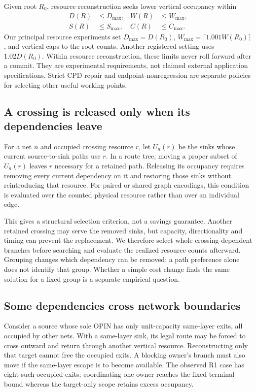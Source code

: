 \documentclass[conference,10pt]{IEEEtran}
\begin{document}
Given root $R_0$, resource reconstruction seeks lower vertical occupancy within
\begin{equation}
 \begin{aligned}
 D(R)&\le D_{\max}, & W(R)&\le W_{\max},\\
 S(R)&\le S_{\max}, & C(R)&\le C_{\max}.
 \end{aligned}
\label{eq:budget}
\end{equation}
Our principal resource experiments set $D_{\max}=D(R_0)$, $W_{\max}=\lceil1.001W(R_0)\rceil$, and vertical caps to the root counts. Another registered setting uses $1.02D(R_0)$. Within resource reconstruction, these limits never roll forward after a commit. They are experimental requirements, not claimed external application specifications. Strict CPD repair and endpoint-nonregression are separate policies for selecting other useful working points.

\subsection{A crossing is released only when its dependencies leave}
For a net $n$ and occupied crossing resource $r$, let $U_n(r)$ be the sinks whose current source-to-sink paths use $r$. In a route tree, moving a proper subset of $U_n(r)$ leaves $r$ necessary for a retained path. Releasing its occupancy requires removing every current dependency on it and restoring those sinks without reintroducing that resource. For paired or shared graph encodings, this condition is evaluated over the counted physical resource rather than over an individual edge.

This gives a structural selection criterion, not a savings guarantee. Another retained crossing may serve the removed sinks, but capacity, directionality and timing can prevent the replacement. We therefore select whole crossing-dependent branches before searching and evaluate the realized resource counts afterward. Grouping changes which dependency can be removed; a path preference alone does not identify that group. Whether a simple cost change finds the same solution for a fixed group is a separate empirical question.

\subsection{Some dependencies cross network boundaries}
Consider a source whose sole OPIN has only unit-capacity same-layer exits, all occupied by other nets. With a same-layer sink, its legal route may be forced to cross outward and return through another vertical resource. Reconstructing only that target cannot free the occupied exits. A blocking owner's branch must also move if the same-layer escape is to become available. The observed R1 case has eight such occupied exits; coordinating one owner reaches the fixed terminal bound whereas the target-only scope retains excess occupancy.
\end{document}
